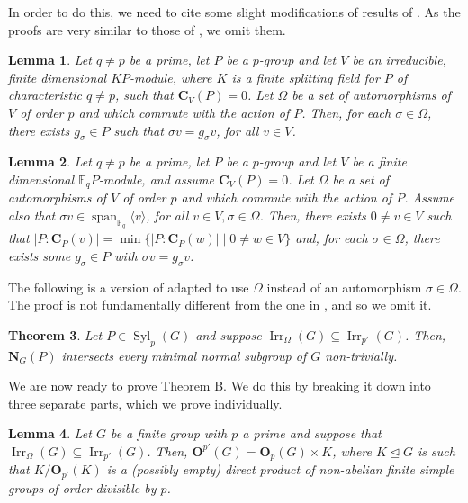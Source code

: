 \documentclass[12pt]{amsart}
\theoremstyle{theorem}
\newtheorem{teo}{Theorem}
\newtheorem{lem}[teo]{Lemma}
\theoremstyle{definition}
\newcommand{\FF}{{\mathbb{F}}}
\newcommand{\bC} {\mathbf C}
\newcommand{\bO}{{\mathbf O}}
\newcommand{\bN} {\mathbf N}
\newcommand{\Irr}{{\operatorname{Irr}}}
\newcommand{\Syl}{{\operatorname{Syl}}}
\begin{document}
	In order to do this, we need to cite some slight modifications of results of \cite{GritPSolvable}. As the proofs are very similar to those of \cite{GritPSolvable}, we omit them.
	
	\begin{lem}
		\label{GritLemma1}
		Let $q \neq p$ be a prime, let $P$ be a $p$-group and let $V$ be an irreducible, finite dimensional $KP$-module, where $K$ is a finite splitting field for $P$ of characteristic $q \neq p$, such that $\bC_V(P) = 0$. Let $\Omega$ be a set of automorphisms of $V$ of order $p$ and which commute with the action of $P$. Then, for each $\sigma \in \Omega$, there exists $g_\sigma \in P$ such that $\sigma v = g_\sigma v$, for all $v \in V$.
	\end{lem}
	
	\begin{lem}
		\label{GritLemma2}
		Let $q \neq p$ be a prime, let $P$ be a $p$-group and let $V$ be a finite dimensional $\FF_qP$-module, and assume $\bC_V(P) = 0$. Let $\Omega$ be a set of automorphisms of $V$ of order $p$ and which commute with the action of $P$. Assume also that $\sigma v \in \operatorname{span}_{\FF_q} \langle v \rangle$, for all $v \in V, \sigma \in \Omega$. Then, there exists $0 \neq v \in V$ such that $|P:\bC_P(v)| = \min\{|P:\bC_P(w)| \mid 0 \neq w \in V\}$ and, for each $\sigma \in \Omega$, there exists some $g_\sigma \in P$ with $\sigma v = g_\sigma v$.
	\end{lem}
	
	The following is a version of \cite[Theorem B]{GritPSolvable} adapted to use $\Omega$ instead of an automorphism $\sigma \in \Omega$. The proof is not fundamentally different from the one in \cite{GritPSolvable}, and so we omit it.
	
	\begin{teo}
		\label{GritThmB}
		Let $P \in \Syl_p(G)$ and suppose $\Irr_\Omega(G) \subseteq \Irr_{p'}(G)$. Then, $\bN_G(P)$ intersects every minimal normal subgroup of $G$ non-trivially.
	\end{teo}
	
	We are now ready to prove Theorem B. We do this by breaking it down into three separate parts, which we prove individually.
	
	\begin{lem}
		\label{Part1}
		Let $G$ be a finite group with $p$ a prime and suppose that $\Irr_{\Omega}(G) \subseteq \Irr_{p'}(G)$. Then, $\bO^{p'}(G) = \bO_p(G) \times K$, where $K \unlhd G$ is such that $K/\bO_{p'}(K)$ is a (possibly empty) direct product of non-abelian finite simple groups of order divisible by $p$.
	\end{lem}
\end{document}

